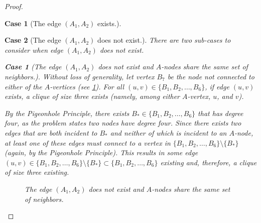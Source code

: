 \documentclass{article}
\newtheorem{case}{Case}
\newtheorem{subcase}{Case}
\numberwithin{subcase}{case}
\begin{document}
\begin{proof}
\begin{case}[The edge $(A_{1}, A_{2})$ exists.]
\end{case}

\begin{case}[The edge $(A_{1}, A_{2})$ does not exist.]

There are two sub-cases to consider when edge $(A_{1}, A_{2})$ does not exist.

\begin{subcase}[The edge $(A_{1}, A_{2})$ does not exist and $A$-nodes share the same set of neighbors.]

Without loss of generality, let vertex $B_{7}$ be the node not connected to either of the $A$-vertices (see \cref{fig:case_21}). For all  $(u, v) \in \lbrace B_{1}, B_{2}, \ldots, B_{6} \rbrace$, if edge $(u, v)$ exists, a clique of size three exists (namely, among either $A$-vertex, $u$, and $v$). 

By the Pigeonhole Principle, there exists $B_{*} \in \lbrace B_{1}, B_{2}, \ldots, B_{6} \rbrace$ that has degree four, as the problem states two nodes have degree four. Since there exists two edges that are both incident to $B_{*}$ and neither of which is incident to an $A$-node, at least one of these edges must connect to a vertex in $\lbrace B_{1}, B_{2}, \ldots, B_{6} \rbrace \setminus \lbrace B_{*} \rbrace$ (again, by the Pigeonhole Principle). This results in some edge $(u, v) \in \lbrace B_{1}, B_{2}, \ldots, B_{6} \rbrace \setminus \lbrace B_{*} \rbrace \subset \lbrace B_{1}, B_{2}, \ldots, B_{6} \rbrace$ existing and, therefore, a clique of size three existing.

    \begin{figure}[H]
        \centering
    \caption{The edge $(A_{1}, A_{2})$ does not exist and $A$-nodes share the same set of neighbors.}
    \label{fig:case_21}
    \end{figure}


\end{subcase}
\end{case}
\end{proof}
\end{document}
